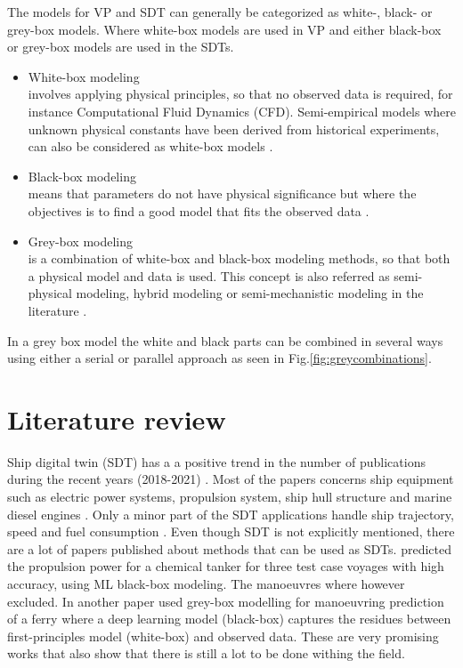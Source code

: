 The models for VP and SDT can generally be categorized as white-, black- or grey-box models. Where 
white-box models are used in VP and either black-box or grey-box models are used in the SDTs. 
\begin{itemize}
    \item White-box modeling \\
    involves applying physical principles, so that no observed data is required, for instance Computational Fluid Dynamics (CFD). Semi-empirical models where unknown physical constants have been derived from historical experiments, can also be considered as white-box models \cite{leifsson_grey-box_2008}.  

    \item Black-box modeling \\
    means that parameters do not have physical significance but where the objectives is to find a good model that fits the observed data \cite{lindskog_tools_1995}.
    
    \item Grey-box modeling \\
    is a combination of white-box and black-box modeling methods, so that both a physical model and data is used. This concept is also referred as semi-physical modeling, hybrid modeling or semi-mechanistic modeling in the literature \cite{leifsson_grey-box_2008}. 
\end{itemize}

\noindent In a grey box model the white and black parts can be combined in several ways using either a serial or parallel approach \cite{leifsson_grey-box_2008} as seen in Fig.\ref{fig:greycombinations}. 



\section{Literature review}
Ship digital twin (SDT) has a a positive trend in the number of publications during the recent years (2018-2021)  \cite{assani_ships_2022}. Most of the papers concerns ship equipment such as electric power systems, propulsion system, ship hull structure and marine diesel engines \cite{assani_ships_2022}. Only a minor part of the SDT applications handle ship trajectory, speed and fuel consumption \cite{assani_ships_2022}.   
Even though SDT is not explicitly mentioned, there are a lot of papers published about methods that can be used as SDTs. \cite{lang_comparison_2022} predicted the propulsion power for a chemical tanker for three test case voyages with high accuracy, using ML black-box modeling. The manoeuvres where however excluded. In another paper \cite{nielsen_machine_2022} used grey-box modelling for manoeuvring prediction of a ferry where a deep learning model (black-box) captures the residues between first-principles model (white-box) and observed data. These are very promising works that also show that there is still a lot to be done withing the field. 

